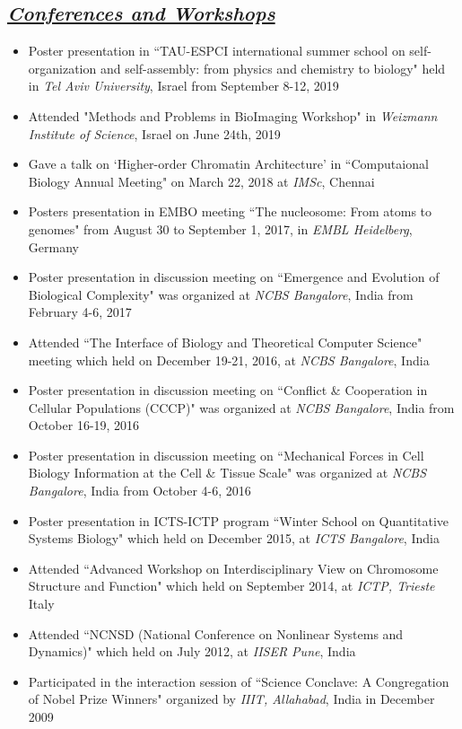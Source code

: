 \documentclass{res}
\begin{document}
\begin{resume}
\begin{itemize}
\section{\sl \underline{Conferences and Workshops}} 
\begin{itemize}
\item Poster presentation in ``TAU-ESPCI international summer school on self-organization and self-assembly: from physics and chemistry to biology" held in {\it Tel Aviv University}, Israel from September 8-12, 2019
\item Attended "Methods and Problems in BioImaging Workshop" in {\it Weizmann Institute of Science}, Israel on June 24th, 2019
\item Gave a talk on `Higher-order Chromatin Architecture' in ``Computaional Biology Annual Meeting" on March 22, 2018 at {\it IMSc}, Chennai
\item Posters presentation in EMBO meeting ``The nucleosome: From atoms to genomes" from August 30 to September 1, 2017, in {\it EMBL Heidelberg}, Germany
\item Poster presentation in discussion meeting on ``Emergence and Evolution of Biological Complexity" was organized at {\it NCBS Bangalore}, India from February 4-6,  2017 
\item Attended ``The Interface of Biology and Theoretical Computer Science" meeting which held on December 19-21, 2016, at {\it NCBS Bangalore}, India
\item Poster presentation in discussion meeting on ``Conflict \& Cooperation in Cellular Populations (CCCP)" was organized at {\it NCBS Bangalore}, India from October 16-19,  2016 
\item Poster presentation in discussion meeting on ``Mechanical Forces in Cell Biology Information at the Cell \& Tissue Scale" was organized at {\it NCBS Bangalore}, India from October 4-6, 2016  
\item Poster presentation in ICTS-ICTP program ``Winter School on Quantitative Systems Biology" which held on December 2015, at {\it ICTS Bangalore}, India
\item Attended ``Advanced Workshop on Interdisciplinary View on Chromosome Structure and Function" which held on September 2014, at {\it ICTP, Trieste} Italy 
\item Attended ``NCNSD (National Conference on Nonlinear Systems and Dynamics)" which held on July 2012, at {\it IISER Pune}, India 
\item Participated in the interaction session of ``Science Conclave: A Congregation of Nobel Prize Winners" organized by {\it IIIT, Allahabad}, India in December 2009 
\end{itemize}





\end{itemize}
\end{resume}
\end{document}
